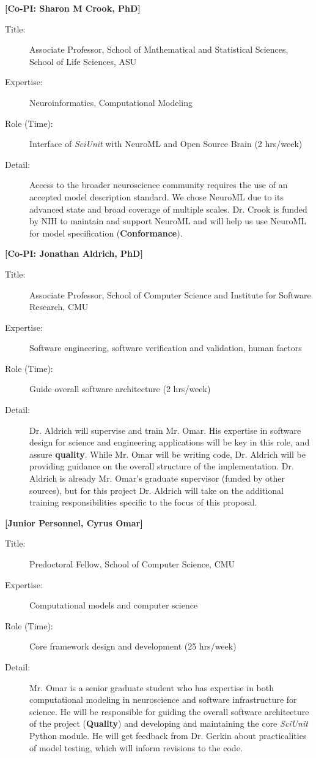 \documentclass[11pt,letterpaper]{article}
\begin{document}
\textbf{[Co-PI: Sharon M Crook, PhD]}
\begin{description}
\item[Title:] Associate Professor, School of Mathematical and Statistical Sciences, School of Life Sciences, ASU
\item[Expertise:] Neuroinformatics, Computational Modeling
\item[Role (Time):] Interface of \textit{SciUnit} with NeuroML and Open Source Brain (2 hrs/week)
\item[Detail:] Access to the broader neuroscience community requires the use of an accepted model description standard.  We chose NeuroML due to its advanced state and broad coverage of multiple scales.  Dr. Crook is funded by NIH to maintain and support NeuroML and will help us use NeuroML for model specification (\textbf{Conformance}).  
\end{description}
\textbf{[Co-PI: Jonathan Aldrich, PhD]}
\begin{description}
\item[Title:] Associate Professor, School of Computer Science and Institute for Software Research, CMU
\item[Expertise:] Software engineering, software verification and validation, human factors
\item[Role (Time):] Guide overall software architecture (2 hrs/week)
\item[Detail:] Dr. Aldrich will supervise and train Mr. Omar.  His expertise in software design for science and engineering applications will be key in this role, and assure \textbf{quality}.  While Mr. Omar will be writing code, Dr. Aldrich will be providing guidance on the overall structure of the implementation.  Dr. Aldrich is already Mr. Omar's graduate supervisor (funded by other sources), but for this project Dr. Aldrich will take on the additional training responsibilities specific to the focus of this proposal.  
\end{description}
\textbf{[Junior Personnel, Cyrus Omar]}
\begin{description}
\item[Title:] Predoctoral Fellow, School of Computer Science, CMU
\item[Expertise:] Computational models and computer science 
\item[Role (Time):] Core framework design and development (25 hrs/week)
\item[Detail:] Mr. Omar is a senior graduate student who has expertise in both computational modeling in neuroscience and software infrastructure for science.  He will be responsible for guiding the overall software architecture of the project (\textbf{Quality}) and developing and maintaining the core \textit{SciUnit} Python module.  He will get feedback from Dr. Gerkin about practicalities of model testing, which will inform revisions to the code.  
\end{description}
\end{document}
